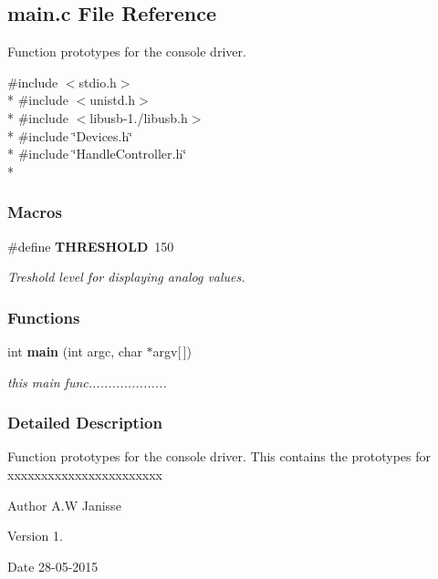 \subsection{main.\-c File Reference}
\label{main_8c}


Function prototypes for the console driver.  


{\ttfamily \#include $<$stdio.\-h$>$}\\*
{\ttfamily \#include $<$unistd.\-h$>$}\\*
{\ttfamily \#include $<$libusb-\/1./libusb.\-h$>$}\\*
{\ttfamily \#include \char`\"{}Devices.\-h\char`\"{}}\\*
{\ttfamily \#include \char`\"{}Handle\-Controller.\-h\char`\"{}}\\*
\subsubsection*{Macros}
\begin{DoxyCompactItemize}
\item 
\#define {\bf T\-H\-R\-E\-S\-H\-O\-L\-D}~150\label{main_8c_a4679d8ea8690999a6c6c7c0cb245c879}

\begin{DoxyCompactList}\small\item\em Treshold level for displaying analog values. \end{DoxyCompactList}\end{DoxyCompactItemize}
\subsubsection*{Functions}
\begin{DoxyCompactItemize}
\item 
int {\bf main} (int argc, char $\ast$argv[$\,$])
\begin{DoxyCompactList}\small\item\em this main func.................... \end{DoxyCompactList}\end{DoxyCompactItemize}


\subsubsection{Detailed Description}
Function prototypes for the console driver. This contains the prototypes for xxxxxxxxxxxxxxxxxxxxxxx

\begin{DoxyAuthor}{Author}
A.\-W Janisse 
\end{DoxyAuthor}
\begin{DoxyVersion}{Version}
1. 
\end{DoxyVersion}
\begin{DoxyDate}{Date}
28-\/05-\/2015 
\end{DoxyDate}


